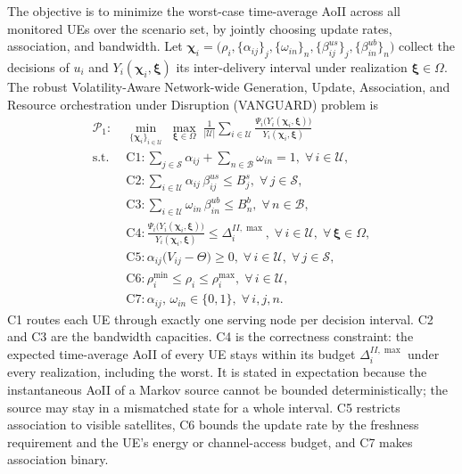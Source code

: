 The objective is to minimize the worst-case time-average AoII across all monitored UEs over the scenario set, by
jointly choosing update rates, association, and bandwidth. Let $\boldsymbol{\chi}_i=\bigl(\rho_i,\{\alpha_{ij}\}_{j},
\{\omega_{in}\}_{n},\{\beta^{us}_{ij}\}_{j},\{\beta^{ub}_{in}\}_{n}\bigr)$ collect the decisions of $u_i$ and
$Y_i(\boldsymbol{\chi}_i,\boldsymbol{\xi})$ its inter-delivery interval under realization $\boldsymbol{\xi}\in\Omega$.
The robust Volatility-Aware Network-wide Generation, Update, Association, and Resource orchestration under
Disruption (VANGUARD) problem is
\begin{align}
    \mathscr{P}_{1}:\;&\min_{\{\boldsymbol{\chi}_i\}_{i\in\mathscr{U}}}
    \;\max_{\boldsymbol{\xi}\in\Omega}
    \;\frac{1}{|\mathscr{U}|}\sum_{i\in\mathscr{U}}
    \frac{\Psi_{i}\bigl(Y_{i}(\boldsymbol{\chi}_i,\boldsymbol{\xi})\bigr)}
    {Y_{i}(\boldsymbol{\chi}_i,\boldsymbol{\xi})}
    \nonumber\\
    \text{s.t.}\;\;
    &\text{C1}:\sum_{j\in\mathscr{S}}\alpha_{ij}+\sum_{n\in\mathscr{B}}\omega_{in}=1,\;\forall\,i\in\mathscr{U},
    \nonumber\\
    &\text{C2}:\sum_{i\in\mathscr{U}}\alpha_{ij}\,\beta^{us}_{ij}\leq B^{s}_{j},\;\forall\,j\in\mathscr{S},
    \nonumber\\
    &\text{C3}:\sum_{i\in\mathscr{U}}\omega_{in}\,\beta^{ub}_{in}\leq B^{b}_{n},\;\forall\,n\in\mathscr{B},
    \nonumber\\
    &\text{C4}:\frac{\Psi_{i}\bigl(Y_{i}(\boldsymbol{\chi}_i,\boldsymbol{\xi})\bigr)}
    {Y_{i}(\boldsymbol{\chi}_i,\boldsymbol{\xi})}\leq\Delta_{i}^{II,\max},
    \;\forall\,i\in\mathscr{U},\;\forall\,\boldsymbol{\xi}\in\Omega,
    \nonumber\\
    &\text{C5}:\alpha_{ij}\bigl(V_{ij}-\Theta\bigr)\geq 0,\;\forall\,i\in\mathscr{U},\;\forall\,j\in\mathscr{S},
    \nonumber\\
    &\text{C6}:\rho_{i}^{\min}\leq\rho_{i}\leq\rho_{i}^{\max},\;\forall\,i\in\mathscr{U},
    \nonumber\\
    &\text{C7}:\alpha_{ij},\,\omega_{in}\in\{0,1\},\;\forall\,i,j,n.
    \nonumber
\end{align}
C1 routes each UE through exactly one serving node per decision interval. C2 and C3 are the bandwidth capacities. C4
is the correctness constraint: the expected time-average AoII of every UE stays within its budget
$\Delta_i^{II,\max}$ under every realization, including the worst. It is stated in expectation because the
instantaneous AoII of a Markov source cannot be bounded deterministically; the source may stay in a mismatched state
for a whole interval. C5 restricts association to visible satellites, C6 bounds the update rate by the freshness
requirement and the UE's energy or channel-access budget, and C7 makes association binary.


